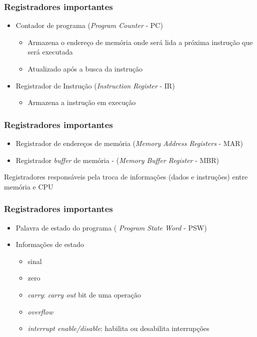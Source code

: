\documentclass[aspectratio=169,
				xcolor=table]{beamer}
\begin{document}
		\begin{frame}
			\frametitle{Registradores importantes}
			\begin{itemize}
				\item Contador de programa (\textit{Program Counter} - PC)	
				\begin{itemize}
					\item Armazena o endereço de memória onde será lida a próxima instrução que será executada
					\item Atualizado após a busca da instrução
				\end{itemize}
				\vspace{1em}
				\item Registrador de Instrução (\textit{Instruction Register} - IR)
				\begin{itemize}
					\item Armazena a instrução em execução
				\end{itemize}
			\end{itemize}
		\end{frame}
		
		\begin{frame}
			\frametitle{Registradores importantes}
			\begin{itemize}
			 \item Registrador de endereços de memória (\textit{Memory Address Registers} - MAR)
			 \vspace{1em}
			 \item Registrador \textit{buffer} de memória - (\textit{Memory Buffer Register} - MBR)
			\end{itemize}
			
			\vspace{1em}
			\Large \alert{Registradores responsáveis pela troca de informações (dados e instruções) entre memória e CPU}
		\end{frame}
		
		\begin{frame}
			\frametitle{Registradores importantes}
			\begin{itemize}
				\item Palavra de estado do programa ( \textit{Program State Word} - PSW)
				\vspace{1em}
				\item Informações de estado 
				\begin{itemize}
					\item sinal
					\item zero
					\item \textit{carry}: \textit{carry out} bit de uma operação
					\item \textit{overflow}
					\item  \textit{interrupt enable/disable}: habilita ou desabilita interrupções
				\end{itemize}
			\end{itemize}
		\end{frame}
		
\end{document}
